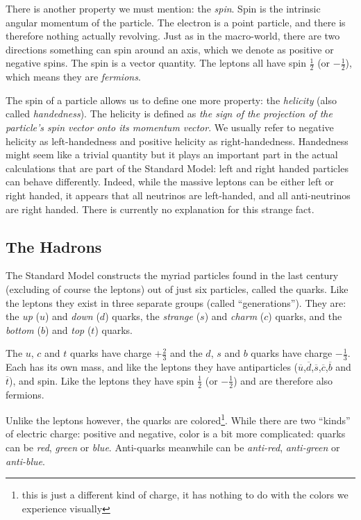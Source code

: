 
There is another property we must mention: the \textit{spin}. Spin is the intrinsic angular momentum of the particle. The electron is a point particle, and there is therefore nothing actually revolving. Just as in the macro-world, there are two directions something can spin around an axis, which we denote as positive or negative spins. The spin is a vector quantity. The leptons all have spin $\frac{1}{2}$ (or $-\frac{1}{2}$), which means they are \textit{fermions}. 

The spin of a particle allows us to define one more property: the \textit{helicity} (also called \textit{handedness}). The helicity is defined as \textit{the sign of the projection of the particle's spin vector onto its momentum vector}. We usually refer to negative helicity as left-handedness and positive helicity as right-handedness. Handedness might seem like a trivial quantity but it plays an important part in the actual calculations that are part of the Standard Model: left and right handed particles can behave differently. Indeed, while the massive leptons can be either left or right handed, it appears that all neutrinos are left-handed, and all anti-neutrinos are right handed. There is currently no explanation for this strange fact.

\subsection{The Hadrons}
The Standard Model constructs the myriad particles found in the last century (excluding of course the leptons) out of just six particles, called the quarks. Like the leptons they exist in three separate groups (called ``generations''). They are: the \textit{up} ($u$) and \textit{down} ($d$) quarks, the \textit{strange} ($s$) and \textit{charm} ($c$) quarks, and the \textit{bottom} ($b$) and \textit{top} ($t$) quarks.

The $u$, $c$ and $t$ quarks have charge $+\frac{2}{3}$ and the $d$, $s$ and $b$ quarks have charge $-\frac{1}{3}$. Each has its own mass, and like the leptons they have antiparticles ($\overline{u}$,$\overline{d}$,$\overline{s}$,$\overline{c}$,$\overline{b}$ and $\overline{t}$), and spin. Like the leptons they have spin  $\frac{1}{2}$ (or $-\frac{1}{2}$) and are therefore also fermions.

Unlike the leptons however, the quarks are colored\footnote{this is just a different kind of charge, it has nothing to do with the colors we experience visually}. While there are two ``kinds'' of electric charge: positive and negative, color is a bit more complicated: quarks can be \textit{red}, \textit{green} or \textit{blue}. Anti-quarks meanwhile can be \textit{anti-red}, \textit{anti-green} or \textit{anti-blue}.

